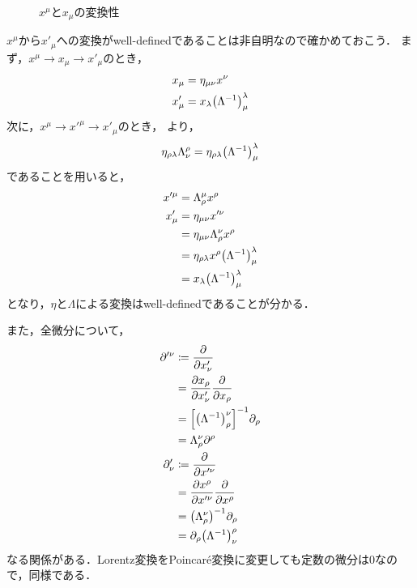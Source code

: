 \documentclass{report}
\begin{document}
    \begin{figure}[H]
      \centering
      \caption{$x^{\mu}$と$x_{\mu}$の変換性}\label{transform}
    \end{figure}
    $x^{\mu}$から$x'_{\mu}$への変換がwell-definedであることは非自明なので確かめておこう．
    まず，$x^{\mu} \to x_{\mu} \to x'_{\mu}$のとき，
    \begin{align}
      x_{\mu} &= \eta_{\mu\nu}x^{\nu} \\ 
      x'_{\mu} &= x_{\lambda}\qty(\Lambda^{-1})_{\mu}^{\lambda}
    \end{align}
    次に，$x^{\mu} \to x'^{\mu} \to x'_{\mu}$のとき，
    より，
    \begin{align}
      \eta_{\rho\lambda}\Lambda_{\nu}^{\rho} = \eta_{\rho\lambda}\qty(\Lambda^{-1})_{\mu}^{\lambda}
    \end{align}
    であることを用いると，
    \begin{align}
      x'^{\mu} &= \Lambda_{\rho}^{\mu}x^{\rho} \\ 
      x'_{\mu} &= \eta_{\mu\nu}x'^{\nu} \\ 
      &= \eta_{\mu\nu}\Lambda_{\rho}^{\nu}x^{\rho} \\ 
      &= \eta_{\rho\lambda}x^{\rho}\qty(\Lambda^{-1})_{\mu}^{\lambda} \\ 
      &= x_{\lambda}\qty(\Lambda^{-1})_{\mu}^{\lambda}
    \end{align}
    となり，$\eta$と$\Lambda$による変換はwell-definedであることが分かる．
    \par
    また，全微分について，
    \begin{align}
      \partial'^{\nu} &\coloneqq \pdv{x'_{\nu}} \\ 
      &= \pdv{x_{\rho}}{x'_{\nu}}\pdv{x_{\rho}} \\ 
      &= \qty[\qty(\Lambda^{-1})_{\rho}^{\nu}]^{-1}\partial_{\rho} \\ 
      &= \Lambda_{\rho}^{\nu}\partial^{\rho} \\ 
      \partial'_{\nu} &\coloneqq \pdv{x'^{\nu}} \\ 
      &= \pdv{x^{\rho}}{x'^{\nu}}\pdv{x^{\rho}} \\ 
      &= \qty(\Lambda_{\rho}^{\nu})^{-1}\partial_{\rho} \\ 
      &= \partial_{\rho}\qty(\Lambda^{-1})_{\nu}^{\rho}
    \end{align}
    なる関係がある．Lorentz変換をPoincar\'e変換に変更しても定数の微分は0なので，同様である．
\end{document}
